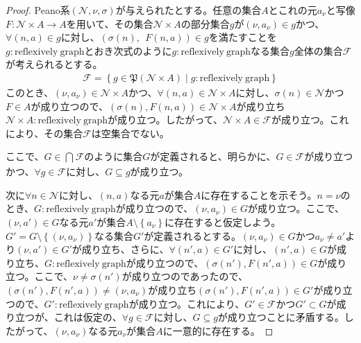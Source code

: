 \documentclass[dvipdfmx]{jsarticle}
\begin{document}
\begin{proof}
Peano系$\left( \mathcal{N,}\nu,\sigma \right)$が与えられたとする。任意の集合$A$とこれの元$a_{\nu}$と写像$F:\mathcal{N \times}A \rightarrow A$を用いて、その集合$\mathcal{N \times}A$の部分集合$g$が$\left( \nu,a_{\nu} \right) \in g$かつ、$\forall(n,a) \in g$に対し、$\left( \sigma(n),\ \ F(n,a) \right) \in g$を満たすことを$g:\mathrm{reflexively\ graph}$とおき次式のように$g:\mathrm{reflexively\ graph}$なる集合$g$全体の集合$\mathcal{F}$が考えられるとする。
\begin{align*}
\mathcal{F} =\left\{ g \in \mathfrak{P}\left( \mathcal{N \times}A \right) \middle| g:\mathrm{reflexively\ graph} \right\}
\end{align*}
このとき、$\left( \nu,a_{\nu} \right)\in \mathcal{N \times}A$かつ、$\forall(n,a)\in \mathcal{N \times}A$に対し、$\sigma(n)\in \mathcal{N}$かつ$F \in A$が成り立つので、$\left( \sigma(n),F(n,a) \right)\in \mathcal{N \times}A$が成り立ち$\mathcal{N \times}A:\mathrm{reflexively\ graph}$が成り立つ。したがって、$\mathcal{N \times}A\in \mathcal{F}$が成り立つ。これにより、その集合$\mathcal{F}$は空集合でない。\par
ここで、$G \in \bigcap_{} \mathcal{F}$のように集合$G$が定義されると、明らかに、$G\in \mathcal{F}$が成り立つかつ、$\forall g\in \mathcal{F}$に対し、$G \subseteq g$が成り立つ。\par
次に$\forall n \in \mathcal{N}$に対し、$(n,a)$なる元$a$が集合$A$に存在することを示そう。$n = \nu$のとき、$G:\mathrm{reflexively\ graph}$が成り立つので、$\left( \nu,a_{\nu} \right) \in G$が成り立つ。ここで、$\left( \nu,a' \right) \in G$なる元$a'$が集合$A \setminus \left\{ a_{\nu} \right\}$に存在すると仮定しよう。$G' = G \setminus \left\{ \left( \nu,a_{\nu} \right) \right\}$なる集合$G'$が定義されるとする。$\left( \nu,a_{\nu} \right) \in G$かつ$a_{\nu} \neq a'$より$\left( \nu,a' \right) \in G'$が成り立ち、さらに、$\forall\left( n',a \right) \in G'$に対し、$\left( n',a \right) \in G$が成り立ち、$G:\mathrm{reflexively\ graph}$が成り立つので、$\left( \sigma\left( n' \right),F\left( n',a \right) \right) \in G$が成り立つ。ここで、$\nu \neq \sigma\left( n' \right)$が成り立つのであったので、$\left( \sigma\left( n' \right),F\left( n',a \right) \right) \neq \left( \nu,a_{\nu} \right)$が成り立ち$\left( \sigma\left( n' \right),F\left( n',a \right) \right) \in G'$が成り立つので、$G':\mathrm{reflexively\ graph}$が成り立つ。これにより、$G'\in \mathcal{F}$かつ$G' \subset G$が成り立つが、これは仮定の、$\forall g\in \mathcal{F}$に対し、$G \subseteq g$が成り立つことに矛盾する。したがって、$\left( \nu,a_{\nu} \right)$なる元$a_{\nu}$が集合$A$に一意的に存在する。\par

\end{proof}
\end{document}
